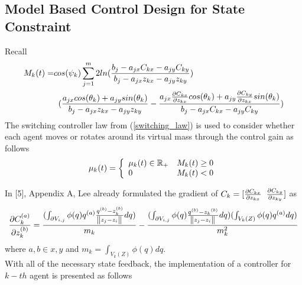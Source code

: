 \subsection{Model Based Control Design for State Constraint}
Recall
\begin{equation} \label{M_k}
\begin{split}
M_k(t) = & cos(\psi_{k}) \displaystyle\sum_{j=1}^{m} 2ln(\frac{b_j - a_{jx}C_{kx} - a_{jy}C_{ky}}{b_j - a_{jx}z_{kx} - a_{jy}z_{ky}})\\
& \txtspc{    } (\frac{a_{jx}cos(\theta_{k}) + a_{jy}sin(\theta_{k})}{b_j - a_{jx}z_{kx} - a_{jy}z_{ky}} - \frac{a_{jx}\frac{\partial C_{kx}}{\partial z_{kx}}cos(\theta_{k}) + a_{jy}\frac{\partial C_{ky}}{\partial z_{kx}}sin(\theta_{k})}{b_j - a_{jx}C_{kx} - a_{jy}C_{ky}})
\end{split}
\end{equation}
The switching controller law from (\ref{switching_law}) is used to consider whether each agent moves or rotates around its virtual mass through the control gain as follows 
\[\mu_k(t) = \left\{ \begin{array}{ll} \mu_k(t) \in \mathbb{R}_+ & M_k(t) \geq 0 \\ 0 & M_k(t) < 0 \end{array} \right.\]

\noindent In [5], Appendix A, Lee already formulated the gradient of $C_k = [\frac{\partial C_{kx}}{\partial z_{kx}} \txtspc{ } \frac{\partial C_{ky}}{\partial z_{ky}}]$ as \\
\begin{equation} \label{grad_C}
\frac{\partial {C}^{(a)}_k}{\partial {z}^{(b)}_k} = \frac{(\int_{\partial V_{i,j}}^{} \phi(q)q^{(a)} \frac{q^{(b)} - {z}^{(b)}_k}{\norm{z_j - z_i}} dq)}{m_k} - \frac{(\int_{\partial V_{i,j}}^{} \phi(q)\frac{q^{(b)} - {z_k}^{(b)}}{\norm{z_j - z_i}} dq)(\int_{V_k(Z)}^{} \phi(q)q^{(a)}dq)}{m^2_k}
\end{equation}
where $a,b \in {x,y}$ and $m_k = \int_{V_k(Z)}^{} \phi(q)dq$. \\
With all of the necessary state feedback, the implementation of a controller for ${k-th}$ agent is presented as follows

